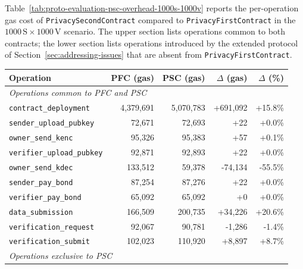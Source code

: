 Table~\ref{tab:proto-evaluation-psc-overhead-1000s-1000v} reports the per-operation gas cost of \texttt{PrivacySecondContract} compared to
\texttt{PrivacyFirstContract} in the $1000\,\text{S} \times 1000\,\text{V}$ scenario.
The upper section lists operations common to both contracts;
the lower section lists operations introduced by the extended
protocol of Section~\ref{sec:addressing-issues} that are absent from \texttt{PrivacyFirstContract}.

\begin{table}
    \centering
    \begin{tabular}{|l|r|r|r|r|}
        \hline
        Operation                          & PFC (gas) & PSC (gas) & $\Delta$ (gas) & $\Delta$ (\%) \\
        \hline
        \multicolumn{5}{l}{\textit{Operations common to PFC and PSC}} \\
        \hline
        \texttt{contract\_deployment}      & 4,379,691 & 5,070,783 & +691,092       & +15.8\%       \\
        \hline
        \texttt{sender\_upload\_pubkey}    & 72,671    & 72,693    & +22            & +0.0\%        \\
        \hline
        \texttt{owner\_send\_kenc}         & 95,326    & 95,383    & +57            & +0.1\%        \\
        \hline
        \texttt{verifier\_upload\_pubkey}  & 92,871    & 92,893    & +22            & +0.0\%        \\
        \hline
        \texttt{owner\_send\_kdec}         & 133,512   & 59,378    & -74,134        & -55.5\%       \\
        \hline
        \texttt{sender\_pay\_bond}         & 87,254    & 87,276    & +22            & +0.0\%        \\
        \hline
        \texttt{verifier\_pay\_bond}       & 65,092    & 65,092    & +0             & +0.0\%        \\
        \hline
        \texttt{data\_submission}          & 166,509   & 200,735   & +34,226        & +20.6\%       \\
        \hline
        \texttt{verification\_request}     & 92,067    & 90,781    & -1,286         & -1.4\%        \\
        \hline
        \texttt{verification\_submit}      & 102,023   & 110,920   & +8,897         & +8.7\%        \\
        \hline
        \multicolumn{5}{l}{\textit{Operations exclusive to PSC}} \\

\end{tabular}
\end{table}
